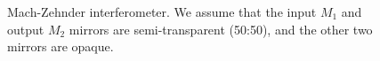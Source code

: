 \begin{figure}
\centering



\caption{Mach-Zehnder interferometer. We assume that the input $M_1$ and
  output $M_2$ mirrors are semi-transparent (50:50), and the other two mirrors
  are opaque.} 
\label{figPart2Interfero_4}
\end{figure}